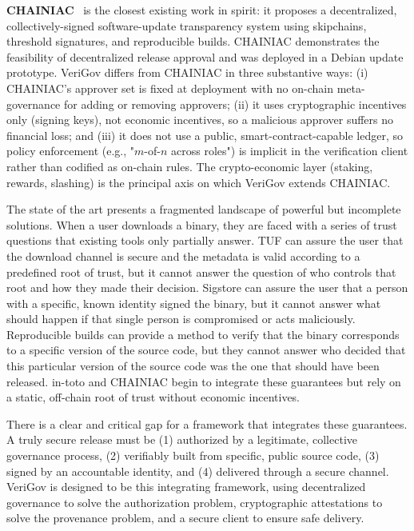 \documentclass{article}
\begin{document}
\textbf{CHAINIAC}~\cite{nikitin2017chainiac} is the closest existing work in spirit: it proposes a decentralized, collectively-signed software-update transparency system using skipchains, threshold signatures, and reproducible builds. CHAINIAC demonstrates the feasibility of decentralized release approval and was deployed in a Debian update prototype. VeriGov differs from CHAINIAC in three substantive ways: (i) CHAINIAC's approver set is fixed at deployment with no on-chain meta-governance for adding or removing approvers; (ii) it uses cryptographic incentives only (signing keys), not economic incentives, so a malicious approver suffers no financial loss; and (iii) it does not use a public, smart-contract-capable ledger, so policy enforcement (e.g., "$m$-of-$n$ across roles") is implicit in the verification client rather than codified as on-chain rules. The crypto-economic layer (staking, rewards, slashing) is the principal axis on which VeriGov extends CHAINIAC.

The state of the art presents a fragmented landscape of powerful but incomplete solutions. When a user downloads a binary, they are faced with a series of trust questions that existing tools only partially answer. TUF can assure the user that the download channel is secure and the metadata is valid according to a predefined root of trust, but it cannot answer the question of who controls that root and how they made their decision. Sigstore can assure the user that a person with a specific, known identity signed the binary, but it cannot answer what should happen if that single person is compromised or acts maliciously. Reproducible builds can provide a method to verify that the binary corresponds to a specific version of the source code, but they cannot answer who decided that this particular version of the source code was the one that should have been released. in-toto and CHAINIAC begin to integrate these guarantees but rely on a static, off-chain root of trust without economic incentives.

There is a clear and critical gap for a framework that integrates these guarantees. A truly secure release must be (1) authorized by a legitimate, collective governance process, (2) verifiably built from specific, public source code, (3) signed by an accountable identity, and (4) delivered through a secure channel. VeriGov is designed to be this integrating framework, using decentralized governance to solve the authorization problem, cryptographic attestations to solve the provenance problem, and a secure client to ensure safe delivery.
\end{document}
